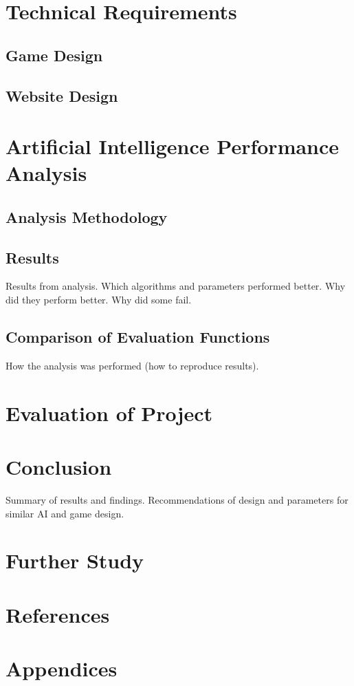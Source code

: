 \documentclass{bhamthesis}
\theoremstyle{definition}
\begin{document}
\chapter{Technical Requirements}

\section{Game Design}
\blindtext

\section{Website Design}
\blindtext

\chapter{Artificial Intelligence Performance Analysis}
\section{Analysis Methodology}
\section{Results}
Results from analysis. \cite{Browne2012}
Which algorithms and parameters performed better.
Why did they perform better.
Why did some fail.
\section{Comparison of Evaluation Functions}
How the analysis was performed (how to reproduce results).
\blindtext

\chapter{Evaluation of Project}
\blindtext

\chapter{Conclusion}
Summary of results and findings. Recommendations of design and parameters for similar AI and game design.

\chapter{Further Study}
\blindtext


\chapter{References}
\printbibliography[heading=none]
%
%

\chapter{Appendices}
\end{document}
